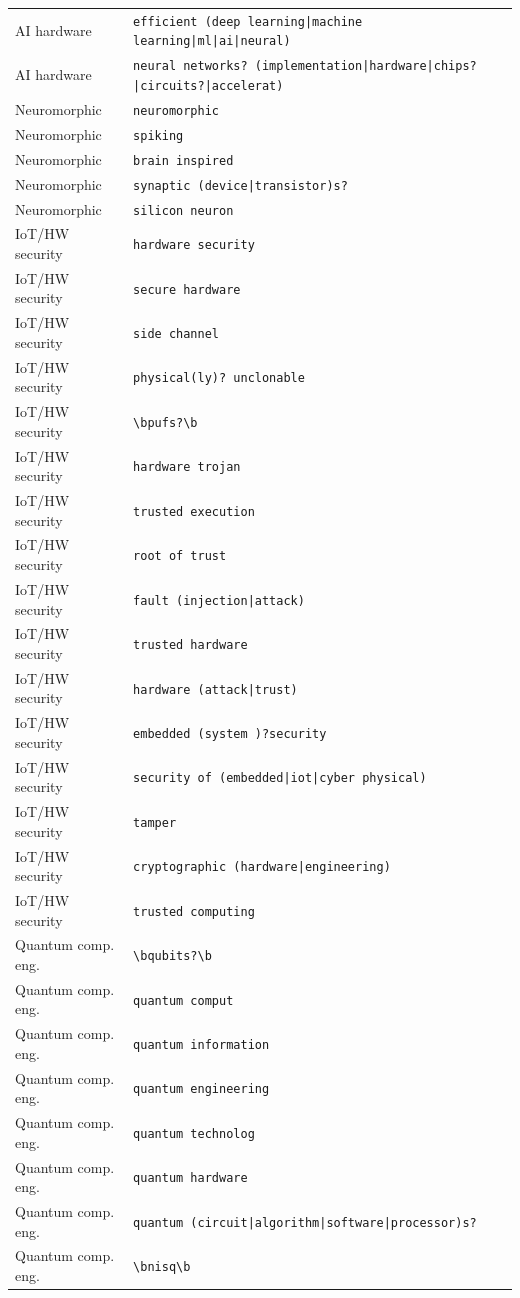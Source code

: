 \documentclass[10pt]{article}
\begin{document}
\begin{longtable}{@{}lL{13cm}@{}}
AI hardware & \texttt{efficient \allowbreak(deep learning\allowbreak|machine learning\allowbreak|ml\allowbreak|ai\allowbreak|neural)} \\
AI hardware & \texttt{neural networks? \allowbreak(implementation\allowbreak|hardware\allowbreak|chips?\allowbreak|circuits?\allowbreak|accelerat)} \\
Neuromorphic & \texttt{neuromorphic} \\
Neuromorphic & \texttt{spiking} \\
Neuromorphic & \texttt{brain inspired} \\
Neuromorphic & \texttt{synaptic \allowbreak(device\allowbreak|transistor)s?} \\
Neuromorphic & \texttt{silicon neuron} \\
IoT/HW security & \texttt{hardware security} \\
IoT/HW security & \texttt{secure hardware} \\
IoT/HW security & \texttt{side channel} \\
IoT/HW security & \texttt{physical\allowbreak(ly)? unclonable} \\
IoT/HW security & \texttt{\textbackslash{}bpufs?\textbackslash{}b} \\
IoT/HW security & \texttt{hardware trojan} \\
IoT/HW security & \texttt{trusted execution} \\
IoT/HW security & \texttt{root of trust} \\
IoT/HW security & \texttt{fault \allowbreak(injection\allowbreak|attack)} \\
IoT/HW security & \texttt{trusted hardware} \\
IoT/HW security & \texttt{hardware \allowbreak(attack\allowbreak|trust)} \\
IoT/HW security & \texttt{embedded \allowbreak(system )?security} \\
IoT/HW security & \texttt{security of \allowbreak(embedded\allowbreak|iot\allowbreak|cyber physical)} \\
IoT/HW security & \texttt{tamper} \\
IoT/HW security & \texttt{cryptographic \allowbreak(hardware\allowbreak|engineering)} \\
IoT/HW security & \texttt{trusted computing} \\
Quantum comp. eng. & \texttt{\textbackslash{}bqubits?\textbackslash{}b} \\
Quantum comp. eng. & \texttt{quantum comput} \\
Quantum comp. eng. & \texttt{quantum information} \\
Quantum comp. eng. & \texttt{quantum engineering} \\
Quantum comp. eng. & \texttt{quantum technolog} \\
Quantum comp. eng. & \texttt{quantum hardware} \\
Quantum comp. eng. & \texttt{quantum \allowbreak(circuit\allowbreak|algorithm\allowbreak|software\allowbreak|processor)s?} \\
Quantum comp. eng. & \texttt{\textbackslash{}bnisq\textbackslash{}b} \\
\end{longtable}
\end{document}
